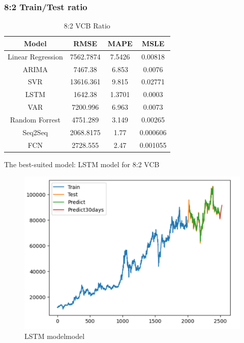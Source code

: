 \documentclass{ieeeojies}
\begin{document}
\subsubsection{8:2 Train/Test ratio}
\begin{table}[H]
    \centering
    \begin{tabular}{|c|c|c|c|}
    \hline
    Model & \textbf{RMSE} & \textbf{MAPE} & \textbf{MSLE} \\
    \hline
    Linear Regression & 7562.7874 & 7.5426 & 0.00818 \\
    \hline
    ARIMA & 7467.38 & 6.853 & 0.0076 \\
    \hline
    SVR & 13616.361 & 9.815 & 0.02771 \\
    \hline
    \rowcolor{red!10}
    LSTM & 1642.38 & 1.3701 & 0.0003 \\
    \hline
    VAR & 7200.996 & 6.963 & 0.0073 \\
    \hline
    Random Forrest & 4751.289 & 3.149 & 0.00265 \\
    \hline
    Seq2Seq & 2068.8175 & 1.77 & 0.000606 \\
    \hline
    FCN & 2728.555 & 2.47 & 0.001055 \\
    \hline
    \end{tabular}
    \caption{8:2 VCB Ratio}
    \label{tab:my_label}
\end{table}
The best-suited model: LSTM model for 8:2 VCB
\begin{figure}[H]
    \centering
    \includegraphics[width=1\linewidth]{vcb_lstm_82.png}
    \caption{LSTM modelmodel}
    \label{fig:enter-label}
\end{figure}
\end{document}
